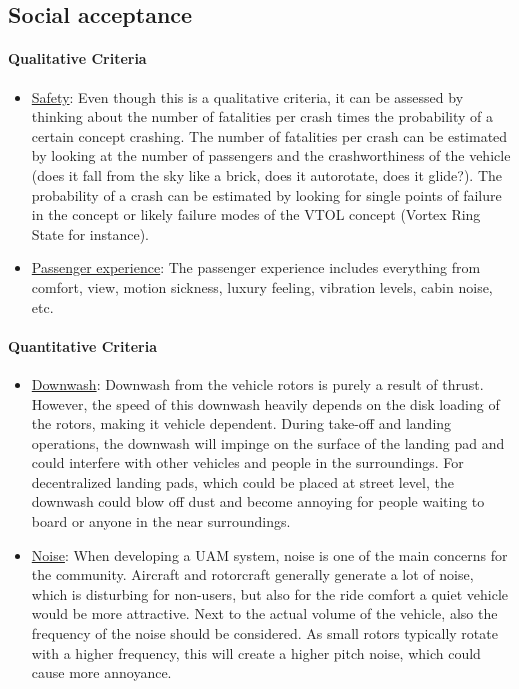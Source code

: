 \subsection{Social acceptance}

\paragraph{Qualitative Criteria}

\begin{itemize}
    \item \underline{Safety}: Even though this is a qualitative criteria, it can be assessed by thinking about the number of fatalities per crash times the probability of a certain concept crashing. The number of fatalities per crash can be estimated by looking at the number of passengers and the crashworthiness of the vehicle (does it fall from the sky like a brick, does it autorotate, does it glide?). The probability of a crash can be estimated by looking for single points of failure in the concept or likely failure modes of the VTOL concept (Vortex Ring State for instance).
    \item \underline{Passenger experience}: The passenger experience includes everything from comfort, view, motion sickness, luxury feeling, vibration levels, cabin noise, etc.
\end{itemize}

\paragraph{Quantitative Criteria}

\begin{itemize}
    \item \underline{Downwash}: Downwash from the vehicle rotors is purely a result of thrust. However, the speed of this downwash heavily depends on the disk loading of the rotors, making it vehicle dependent. During take-off and landing operations, the downwash will impinge on the surface of the landing pad and could interfere with other vehicles and people in the surroundings. For decentralized landing pads, which could be placed at street level, the downwash could blow off dust and become annoying for people waiting to board or anyone in the near surroundings. 
    
    \item \underline{Noise}: When developing a UAM system, noise is one of the main concerns for the community. Aircraft and rotorcraft generally generate a lot of noise, which is disturbing for non-users, but also for the ride comfort a quiet vehicle would be more attractive. Next to the actual volume of the vehicle, also the frequency of the noise should be considered. As small rotors typically rotate with a higher frequency, this will create a higher pitch noise, which could cause more annoyance. 
    
\end{itemize}




